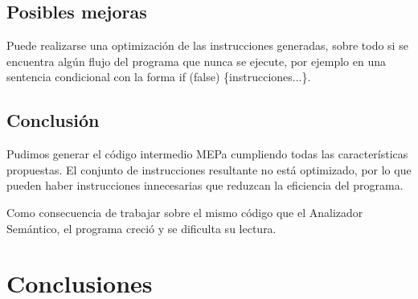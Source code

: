 \section{Posibles mejoras}
Puede realizarse una optimización de las instrucciones generadas, sobre todo si se encuentra algún flujo del programa que nunca se ejecute, por ejemplo en una sentencia condicional con la forma if (false) \{instrucciones...\}.

\section{Conclusión}
Pudimos generar el código intermedio MEPa cumpliendo todas las características propuestas. El conjunto de instrucciones resultante no está optimizado, por lo que pueden haber instrucciones innecesarias que reduzcan la eficiencia del programa.

Como consecuencia de trabajar sobre el mismo código que el Analizador Semántico, el programa creció y se dificulta su lectura.

\chapter{Conclusiones}

